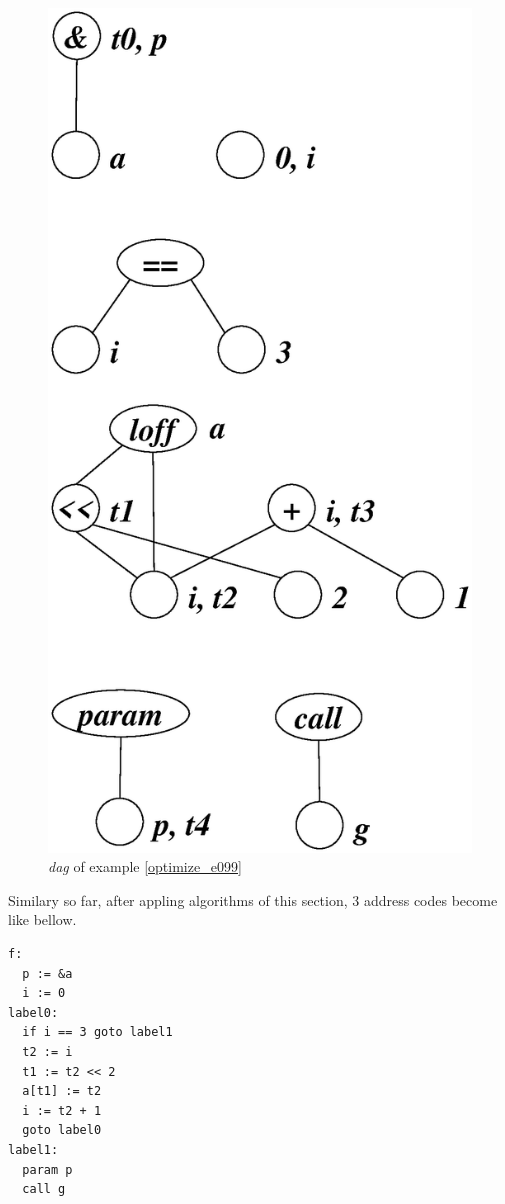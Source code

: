 \begin{Example}
\begin{figure}[htbp]
\begin{center}
\begin{latexonly}
\includegraphics[width=0.619\linewidth,height=1.2\linewidth]{opt043.eps}
\end{latexonly}
\caption{{\em dag} of example \ref{optimize_e099}}
\label{optimize_e100}
\end{center}
\end{figure}
Similary so far, 
after appling algorithms of this section,
3 address codes become like bellow.
\begin{verbatim}
f:
  p := &a
  i := 0
label0:
  if i == 3 goto label1
  t2 := i
  t1 := t2 << 2
  a[t1] := t2
  i := t2 + 1
  goto label0
label1:
  param p
  call g
\end{verbatim}
\end{Example}

